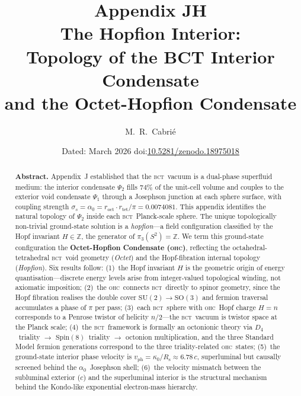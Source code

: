 \documentclass[aps,prl,preprint,superscriptaddress,floatfix]{revtex4-2}
\newcommand{\roct}{r_{\mathrm{oct}}}
\newcommand{\rtet}{r_{\mathrm{tet}}}
\newcommand{\az}{\alpha_0}
\newcommand{\BCT}{\textsc{bct}}
\newcommand{\OHC}{\textsc{ohc}}
\newcommand{\Psiint}{\Psi_2}
\newcommand{\Psiext}{\Psi_1}
\newcommand{\Rsph}{R_{\mathrm{s}}}
\newcommand{\kz}{\kappa_0}
\newcommand{\HopfN}{H}
\newcommand{\vph}{v_{\mathrm{ph}}}
\begin{document}
\title{%
  Appendix JH\\
  The Hopfion Interior:\\
  Topology of the BCT Interior Condensate\\
  and the Octet-Hopfion Condensate
}

\author{M.~R.~Cabri\'{e}}

\date{Dated: March 2026  \quad doi:\href{https://doi.org/10.5281/zenodo.18975018}{10.5281/zenodo.18975018}}

\begin{abstract}
\textbf{Abstract.}
Appendix~J established that the \BCT\ vacuum is a dual-phase superfluid
medium: the interior condensate $\Psiint$ fills $74\%$ of the unit-cell
volume and couples to the exterior void condensate $\Psiext$ through a
Josephson junction at each sphere surface, with coupling strength
$\sigma_s = \az = \roct\cdot\rtet/\pi = 0.0074081$.
This appendix identifies the natural topology of $\Psiint$ inside each
\BCT\ Planck-scale sphere.
The unique topologically non-trivial ground-state solution is a
\emph{hopfion}---a field configuration classified by the Hopf invariant
$\HopfN\in\mathbb{Z}$, the generator of $\pi_3(S^2)=\mathbb{Z}$.
We term this ground-state configuration the
\textbf{Octet-Hopfion Condensate (\OHC)}, reflecting the
octahedral-tetrahedral \BCT\ void geometry (\emph{Octet}) and the
Hopf-fibration internal topology (\emph{Hopfion}).
Six results follow:
(1)~the Hopf invariant $\HopfN$ is the geometric origin of energy
quantisation---discrete energy levels arise from integer-valued
topological winding, not axiomatic imposition;
(2)~the \OHC\ connects \BCT\ directly to spinor geometry, since the
Hopf fibration realises the double cover $\mathrm{SU}(2)\to\mathrm{SO}(3)$
and fermion traversal accumulates a phase of $\pi$ per pass;
(3)~each \BCT\ sphere with \OHC\ Hopf charge $\HopfN=n$ corresponds to a
Penrose twistor of helicity $n/2$---the \BCT\ vacuum is twistor space
at the Planck scale;
(4)~the \BCT\ framework is formally an octonionic theory via
$D_4$~triality $\to$ $\mathrm{Spin}(8)$~triality $\to$ octonion
multiplication, and the three Standard Model fermion generations correspond
to the three triality-related \OHC\ states;
(5)~the ground-state interior phase velocity is
$\vph = \kz/\Rsph \approx 6.78\,c$, superluminal but causally screened
behind the $\az$~Josephson shell;
(6)~the velocity mismatch between the subluminal exterior ($c$) and the
superluminal interior is the structural mechanism behind the
Kondo-like exponential electron-mass hierarchy.
\end{abstract}
\end{document}
